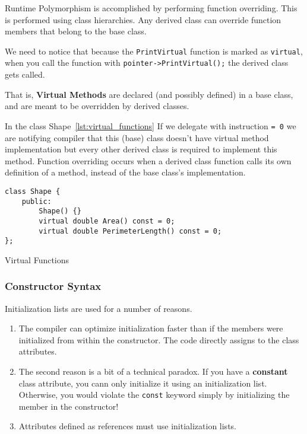 \documentclass[11pt, a4paper]{article}
\begin{document}
Runtime Polymorphism is accomplished by performing function overriding. This is performed using class hierarchies. Any derived class can override function members that belong to the base class.

We need to notice that because the \texttt{PrintVirtual} function is marked as \texttt{virtual}, when you call the function with \texttt{pointer->PrintVirtual();} the derived class gets called.

That is, \textbf{Virtual Methods} are declared (and possibly defined) in a base class, and are meant to be overridden by derived classes.


In the class Shape~\ref{lst:virtual_functions} If we delegate with instruction \texttt{= 0} we are notifying compiler that this (base) class doesn't have virtual method implementation but every other derived class is required to implement this method.
Function overriding occurs when a derived class function calls its own definition of a method, instead of the base class's implementation. 

\begin{listing}
\begin{verbatim}
class Shape {
	public:
		Shape() {}
		virtual double Area() const = 0;
		virtual double PerimeterLength() const = 0;
};
\end{verbatim}
\caption{Virtual Functions}
\label{lst:virtual_functions}
\end{listing}



\subsubsection{Constructor Syntax}%
\label{ssub:constructor_syntax}

Initialization lists are used for a number of reasons. 
\begin{enumerate}
	\item The compiler can optimize initialization faster than if the members were initialized from within the constructor. The code directly assigns to the class attributes. 
	\item The second reason is a bit of a technical paradox. If you have a \textbf{constant} class attribute, you cann only initialize it using an initialization list. Otherwise, you would violate the \texttt{const} keyword simply by initializing the member in the constructor!
	\item Attributes defined as references must use initialization lists.
\end{enumerate}
\end{document}
